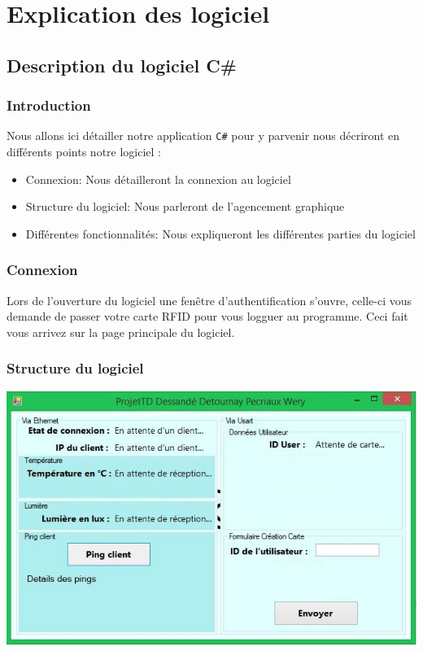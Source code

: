 \documentclass[12pt,a4paper]{report}
\begin{document}
			
\chapter{Explication des logiciel}
	\section{Description du logiciel C\#}
		\subsection{Introduction}
		Nous allons ici détailler notre application \verb+C#+ pour y parvenir nous décriront en différents points notre logiciel : 
			\begin{itemize}
			\item Connexion: Nous détailleront la connexion au logiciel
			\item Structure du logiciel: Nous parleront de l'agencement graphique
			\item Différentes fonctionnalités: Nous expliqueront les différentes parties du logiciel
			\end{itemize}
		\subsection{Connexion}
		Lors de l'ouverture du logiciel une fenêtre d'authentification s'ouvre, celle-ci  vous demande de passer votre carte RFID pour vous logguer au programme. Ceci fait vous arrivez sur la page principale du logiciel.
		\subsection{Structure du logiciel}
		\begin{center}
		\includegraphics[scale=0.8]{ImageElec.jpg}
		\end{center}
		
\end{document}

